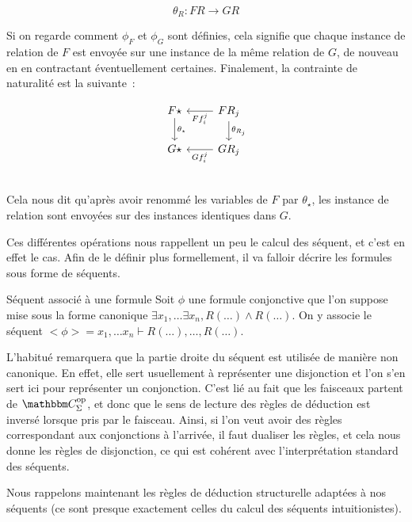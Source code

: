 \[ \theta_R : FR\rightarrow GR\]

Si on regarde comment $\phi_F$ et $\phi_G$ sont définies, cela signifie que chaque
instance de relation de $F$ est envoyée sur une instance de la même relation de $G$,
de nouveau en en contractant éventuellement certaines. Finalement, la contrainte
de naturalité est la suivante~:

\[\begin{tikzcd}
    F\star \arrow[d, "\theta_\star"] & FR_j \arrow[l, "Ff_i^j"]
                                            \arrow[d, "\theta_{R_j}"] \\
    G\star & GR_j \arrow[l, "Gf_i^j"] \\
\end{tikzcd}\]

Cela nous dit qu'après avoir renommé les variables de $F$ par $\theta_\star$, les
instance de relation sont envoyées sur des instances identiques dans $G$.

Ces différentes opérations nous rappellent un peu le calcul des séquent, et
c'est en effet le cas. Afin de le définir plus formellement, il va falloir décrire
les formules sous forme de séquents.

\begin{defi}{Séquent associé à une formule}
    Soit $\phi$ une formule conjonctive que l'on suppose mise sous la
    forme canonique $\exists x_1,\dots\exists x_n, R(\dots)\wedge R(\dots)$. On
    y associe le séquent $<\phi> = x_1,\dots x_n\vdash R(\dots), \dots, R(\dots)$.
\end{defi}

\begin{rem}
    L'habitué remarquera que la partie droite du séquent est utilisée de manière non
    canonique. En effet, elle sert usuellement à représenter une disjonction et
    l'on s'en sert ici pour représenter un conjonction. C'est lié au fait que
    les faisceaux partent de $\C_\Sigma^\text{op}$, et donc que le sens de lecture
    des règles de déduction est inversé lorsque pris par le faisceau. Ainsi, si l'on
    veut avoir des règles correspondant aux conjonctions à l'arrivée, il faut dualiser
    les règles, et cela nous donne les règles de disjonction, ce qui est cohérent avec
    l'interprétation standard des séquents.
\end{rem}

Nous rappelons maintenant les règles de déduction structurelle adaptées à nos séquents
(ce sont presque exactement celles du calcul des séquents intuitionistes).

